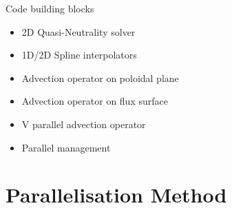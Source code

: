 \documentclass{beamer}
\begin{document}
\begin{frame}{Code building blocks}
\begin{minipage}{.6\textwidth}
 \begin{itemize}
  \item 2D Quasi-Neutrality solver
  \item 1D/2D Spline interpolators
  \item Advection operator on poloidal plane
  \item Advection operator on flux surface
  \item V parallel advection operator
  \item Parallel management
 \end{itemize}
\end{minipage}
\begin{minipage}{.35\textwidth}

\end{minipage}


\end{frame}


\section{Parallelisation Method}
\end{document}
